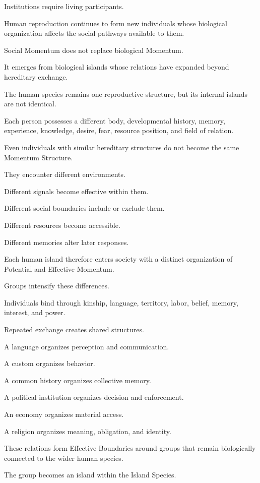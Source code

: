 Institutions require living participants.

Human reproduction continues to form new individuals whose biological organization affects the social pathways available to them.

Social Momentum does not replace biological Momentum.

It emerges from biological islands whose relations have expanded beyond hereditary exchange.

The human species remains one reproductive structure, but its internal islands are not identical.

Each person possesses a different body, developmental history, memory, experience, knowledge, desire, fear, resource position, and field of relation.

Even individuals with similar hereditary structures do not become the same Momentum Structure.

They encounter different environments.

Different signals become effective within them.

Different social boundaries include or exclude them.

Different resources become accessible.

Different memories alter later responses.

Each human island therefore enters society with a distinct organization of Potential and Effective Momentum.

Groups intensify these differences.

Individuals bind through kinship, language, territory, labor, belief, memory, interest, and power.

Repeated exchange creates shared structures.

A language organizes perception and communication.

A custom organizes behavior.

A common history organizes collective memory.

A political institution organizes decision and enforcement.

An economy organizes material access.

A religion organizes meaning, obligation, and identity.

These relations form Effective Boundaries around groups that remain biologically connected to the wider human species.

The group becomes an island within the Island Species.

